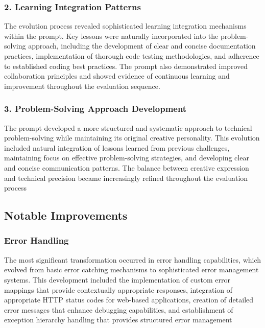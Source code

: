 \documentclass[10pt,a4paper,twocolumn]{article}
\begin{document}
\begin{appendices}
\subsubsection{2. Learning Integration Patterns}

The evolution process revealed sophisticated learning integration mechanisms within the prompt. Key lessons were naturally incorporated into the problem-solving approach, including the development of clear and concise documentation practices, implementation of thorough code testing methodologies, and adherence to established coding best practices. The prompt also demonstrated improved collaboration principles and showed evidence of continuous learning and improvement throughout the evaluation sequence.



\subsubsection{3. Problem-Solving Approach Development}

The prompt developed a more structured and systematic approach to technical problem-solving while maintaining its original creative personality. This evolution included natural integration of lessons learned from previous challenges, maintaining focus on effective problem-solving strategies, and developing clear and concise communication patterns. The balance between creative expression and technical precision became increasingly refined throughout the evaluation process

\subsection{Notable Improvements}

\subsubsection{Error Handling}

The most significant transformation occurred in error handling capabilities, which evolved from basic error catching mechanisms to sophisticated error management systems. This development included the implementation of custom error mappings that provide contextually appropriate responses, integration of appropriate HTTP status codes for web-based applications, creation of detailed error messages that enhance debugging capabilities, and establishment of exception hierarchy handling that provides structured error management


\end{appendices}
\end{document}
